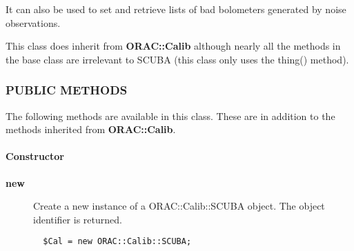 It can also be used to set and retrieve lists of bad bolometers generated
by noise observations.



This class does inherit from \textbf{ORAC::Calib} although nearly all the
methods in the base class are irrelevant to SCUBA (this class only
uses the thing() method).

\subsubsection*{PUBLIC METHODS\label{ORAC::Calib::SCUBA_PUBLIC_METHODS}}

The following methods are available in this class.
These are in addition to the methods inherited from \textbf{ORAC::Calib}.

\paragraph*{Constructor\label{ORAC::Calib::SCUBA_Constructor}}\begin{description}
\item[\textbf{new}] \mbox{}

Create a new instance of a ORAC::Calib::SCUBA object.
The object identifier is returned.

\begin{verbatim}
  $Cal = new ORAC::Calib::SCUBA;
\end{verbatim}
\end{description}
